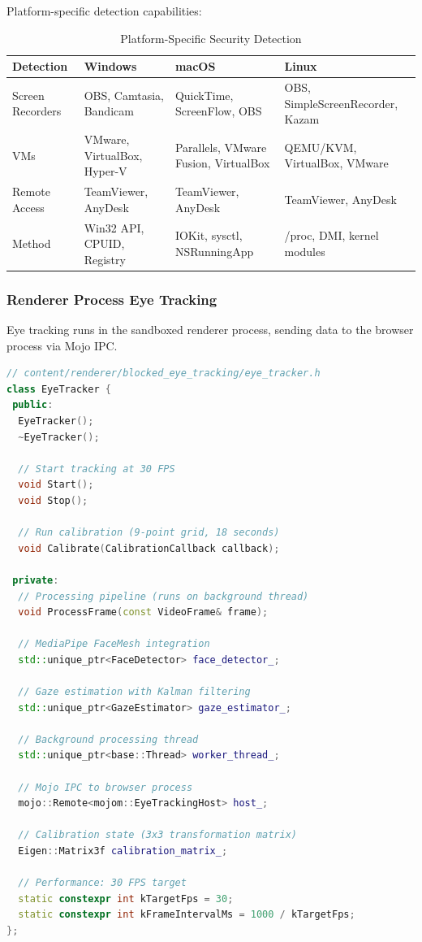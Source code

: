 \documentclass[11pt,letterpaper]{article}
\begin{document}
Platform-specific detection capabilities:

\begin{table}[H]
\centering
\small
\begin{tabularx}{\textwidth}{lXXX}
\toprule
\textbf{Detection} & \textbf{Windows} & \textbf{macOS} & \textbf{Linux} \\
\midrule
Screen Recorders & OBS, Camtasia, Bandicam & QuickTime, ScreenFlow, OBS & OBS, SimpleScreenRecorder, Kazam \\
VMs & VMware, VirtualBox, Hyper-V & Parallels, VMware Fusion, VirtualBox & QEMU/KVM, VirtualBox, VMware \\
Remote Access & TeamViewer, AnyDesk & TeamViewer, AnyDesk & TeamViewer, AnyDesk \\
Method & Win32 API, CPUID, Registry & IOKit, sysctl, NSRunningApp & /proc, DMI, kernel modules \\
\bottomrule
\end{tabularx}
\caption{Platform-Specific Security Detection}
\end{table}

\subsubsection{Renderer Process Eye Tracking}

Eye tracking runs in the sandboxed renderer process, sending data to the browser process via Mojo IPC.

\begin{lstlisting}[language=C++, caption=Eye Tracking Pipeline]
// content/renderer/blocked_eye_tracking/eye_tracker.h
class EyeTracker {
 public:
  EyeTracker();
  ~EyeTracker();

  // Start tracking at 30 FPS
  void Start();
  void Stop();

  // Run calibration (9-point grid, 18 seconds)
  void Calibrate(CalibrationCallback callback);

 private:
  // Processing pipeline (runs on background thread)
  void ProcessFrame(const VideoFrame& frame);

  // MediaPipe FaceMesh integration
  std::unique_ptr<FaceDetector> face_detector_;

  // Gaze estimation with Kalman filtering
  std::unique_ptr<GazeEstimator> gaze_estimator_;

  // Background processing thread
  std::unique_ptr<base::Thread> worker_thread_;

  // Mojo IPC to browser process
  mojo::Remote<mojom::EyeTrackingHost> host_;

  // Calibration state (3x3 transformation matrix)
  Eigen::Matrix3f calibration_matrix_;

  // Performance: 30 FPS target
  static constexpr int kTargetFps = 30;
  static constexpr int kFrameIntervalMs = 1000 / kTargetFps;
};
\end{lstlisting}
\end{document}
